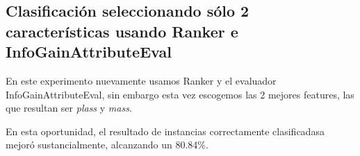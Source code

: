 \subsection{Clasificaci\'on seleccionando s\'olo 2 caracter\'isticas usando Ranker e InfoGainAttributeEval}
En este experimento nuevamente usamos Ranker y el evaluador InfoGainAttributeEval, sin embargo esta vez escogemos las 2 mejores features, las que resultan ser \textit{plass} y \textit{mass}. 
\begin{center}

\end{center}

En esta oportunidad, el resultado de instancias correctamente clasificadasa mejor\'o sustancialmente, alcanzando un 80.84\%. 